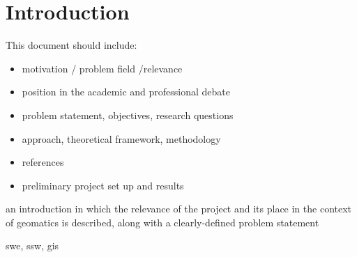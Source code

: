 
\chapter{Introduction}
\label{chap:introduction}

This document should include:

\begin{itemize} 
\item motivation / problem field /relevance

\item position in the academic and professional debate

\item problem statement, objectives, research questions

\item approach, theoretical framework, methodology

\item references

\item preliminary project set up and results

\end{itemize}


an introduction in which the relevance of the project and its place in the context of geomatics is described, along with a clearly-defined problem statement

\ac{swe}, \ac{ssw}, \ac{gis}